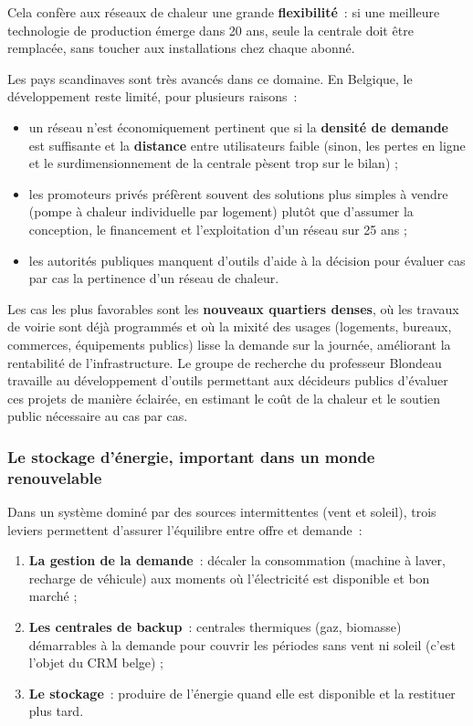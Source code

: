 Cela confère aux réseaux de chaleur une grande \textbf{flexibilité}~: si une meilleure technologie de production émerge dans 20 ans, seule la centrale doit être remplacée, sans toucher aux installations chez chaque abonné.

Les pays scandinaves sont très avancés dans ce domaine. En Belgique, le développement reste limité, pour plusieurs raisons~:
\begin{itemize}
    \item un réseau n'est économiquement pertinent que si la \textbf{densité de demande} est suffisante et la \textbf{distance} entre utilisateurs faible (sinon, les pertes en ligne et le surdimensionnement de la centrale pèsent trop sur le bilan) ;
    \item les promoteurs privés préfèrent souvent des solutions plus simples à vendre (pompe à chaleur individuelle par logement) plutôt que d'assumer la conception, le financement et l'exploitation d'un réseau sur 25 ans ;
    \item les autorités publiques manquent d'outils d'aide à la décision pour évaluer cas par cas la pertinence d'un réseau de chaleur.
\end{itemize}

Les cas les plus favorables sont les \textbf{nouveaux quartiers denses}, où les travaux de voirie sont déjà programmés et où la mixité des usages (logements, bureaux, commerces, équipements publics) lisse la demande sur la journée, améliorant la rentabilité de l'infrastructure. Le groupe de recherche du professeur Blondeau travaille au développement d'outils permettant aux décideurs publics d'évaluer ces projets de manière éclairée, en estimant le coût de la chaleur et le soutien public nécessaire au cas par cas.

\subsubsection{Le stockage d'énergie, important dans un monde renouvelable}

Dans un système dominé par des sources intermittentes (vent et soleil), trois leviers permettent d'assurer l'équilibre entre offre et demande~:
\begin{enumerate}
    \item \textbf{La gestion de la demande}~: décaler la consommation (machine à laver, recharge de véhicule) aux moments où l'électricité est disponible et bon marché ;
    \item \textbf{Les centrales de backup}~: centrales thermiques (gaz, biomasse) démarrables à la demande pour couvrir les périodes sans vent ni soleil (c'est l'objet du CRM belge) ;
    \item \textbf{Le stockage}~: produire de l'énergie quand elle est disponible et la restituer plus tard.
\end{enumerate}

